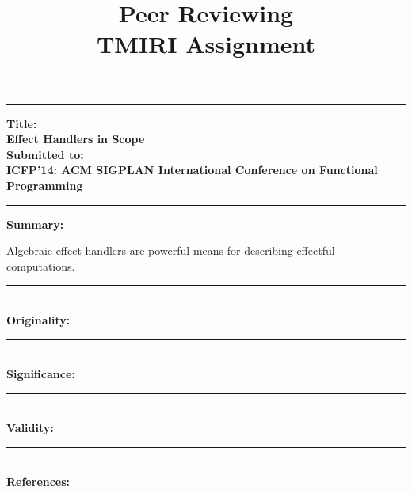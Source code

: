 \documentclass[12pt, a4paper]{article}
\title{%
  \vspace{-10ex}
  Peer Reviewing \\
  \small{TMIRI Assignment}
  \vspace{-10ex}
}
\date{} %
\newcommand{\myhline}[0]{\par\noindent\rule{\textwidth}{0.4pt}\\}
\newenvironment{lined}
    {
    \par\noindent\rule{\textwidth}{0.4pt}
    }
    {
    \vspace{-4ex}
    \par\noindent\rule{\textwidth}{0.4pt}
    }
\begin{document}
\maketitle

\begin{lined}
  \large
  \textbf{Title:\\\vspace{5mm} Effect Handlers in Scope} \\
  \textbf{Submitted to:\\\vspace{5mm} \scriptsize{ICFP'14: ACM SIGPLAN International Conference on Functional Programming}}
\end{lined}


{\normalsize \textbf{Summary:}}
\quad

Algebraic effect handlers are powerful means for describing effectful computations.


\myhline
{\normalsize \textbf{Originality:}}
\quad


\myhline
{\normalsize \textbf{Significance:}}
\quad


\myhline
{\normalsize \textbf{Validity:}}
\quad


\myhline
{\normalsize \textbf{References:}}
\quad
\end{document}
